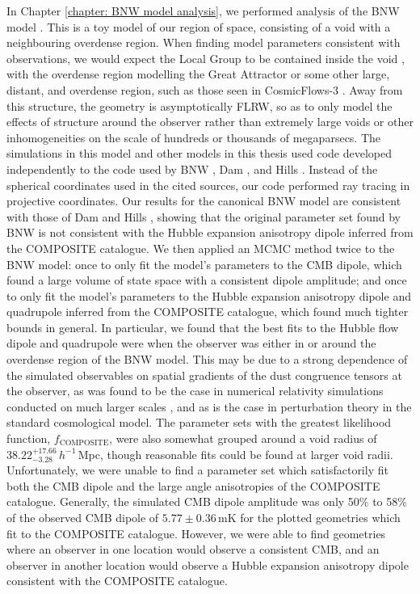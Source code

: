 \documentclass[a4paper,12pt]{report}
\begin{document}
In Chapter \ref{chapter: BNW model analysis}, we performed analysis of the BNW model \cite{RN3}. This is a toy model of our region of space, consisting of a void with a neighbouring overdense region. When finding model parameters consistent with observations, we would expect the Local Group to be contained inside the void \cite{RN74}, with the overdense region modelling the Great Attractor or some other large, distant, and overdense region, such as those seen in CosmicFlows-3 \cite{RN168}. Away from this structure, the geometry is asymptotically FLRW, so as to only model the effects of structure around the observer rather than extremely large voids or other inhomogeneities on the scale of hundreds or thousands of megaparsecs. The simulations in this model and other models in this thesis used code developed independently to the code used by BNW \cite{RN3}, Dam \cite{RN6}, and Hills \cite{RN42}. Instead of the spherical coordinates used in the cited sources, our code performed ray tracing in projective coordinates. Our results for the canonical BNW model are consistent with those of Dam \cite{RN6} and Hills \cite{RN42}, showing that the original parameter set found by BNW is not consistent with the Hubble expansion anisotropy dipole inferred from the COMPOSITE catalogue. We then applied an MCMC method twice to the BNW model: once to only fit the model's parameters to the CMB dipole, which found a large volume of state space with a consistent dipole amplitude; and once to only fit the model's parameters to the Hubble expansion anisotropy dipole and quadrupole inferred from the COMPOSITE catalogue, which found much tighter bounds in general. In particular, we found that the best fits to the Hubble flow dipole and quadrupole were when the observer was either in or around the overdense region of the BNW model. This may be due to a strong dependence of the simulated observables on spatial gradients of the dust congruence tensors at the observer, as was found to be the case in numerical relativity simulations conducted on much larger scales \cite{RN238}, and as is the case in perturbation theory in the standard cosmological model. The parameter sets with the greatest likelihood function, $f_\text{COMPOSITE}$, were also somewhat grouped around a void radius of $38.22^{+17.66}_{-3.28}\, h^{-1}\,$Mpc, though reasonable fits could be found at larger void radii. Unfortunately, we were unable to find a parameter set which satisfactorily fit both the CMB dipole and the large angle anisotropies of the COMPOSITE catalogue. Generally, the simulated CMB dipole amplitude was only 50\% to 58\% of the observed CMB dipole of $5.77 \pm 0.36\,$mK for the plotted geometries which fit to the COMPOSITE catalogue. However, we were able to find geometries where an observer in one location would observe a consistent CMB, and an observer in another location would observe a Hubble expansion anisotropy dipole consistent with the COMPOSITE catalogue.
\end{document}
